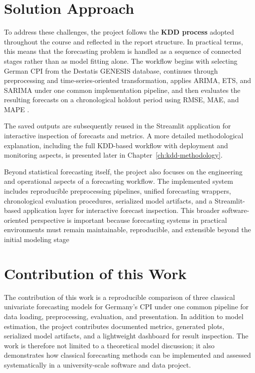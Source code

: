 \section{Solution Approach}
To address these challenges, the project follows the \textbf{KDD process} adopted throughout the course and reflected in the report structure. In practical terms, this means that the forecasting problem is handled as a sequence of connected stages rather than as model fitting alone. The workflow begins with selecting German CPI from the Destatis GENESIS database, continues through preprocessing and time-series-oriented transformation, applies ARIMA, ETS, and SARIMA under one common implementation pipeline, and then evaluates the resulting forecasts on a chronological holdout period using RMSE, MAE, and MAPE \cite{Fayyad:1996,Hyndman2021}.

The saved outputs are subsequently reused in the Streamlit application for interactive inspection of forecasts and metrics. A more detailed methodological explanation, including the full KDD-based workflow with deployment and monitoring aspects, is presented later in Chapter~\ref{ch:kdd-methodology}.

Beyond statistical forecasting itself, the project also focuses on the engineering and operational aspects of a forecasting workflow. The implemented system includes reproducible preprocessing pipelines, unified forecasting wrappers, chronological evaluation procedures, serialized model artifacts, and a Streamlit-based application layer for interactive forecast inspection. This broader software-oriented perspective is important because forecasting systems in practical environments must remain maintainable, reproducible, and extensible beyond the initial modeling stage \cite{Brownlee2017} 

\section{Contribution of this Work}
The contribution of this work is a reproducible comparison of three classical univariate forecasting models for Germany's CPI under one common pipeline for data loading, preprocessing, evaluation, and presentation. In addition to model estimation, the project contributes documented metrics, generated plots, serialized model artifacts, and a lightweight dashboard for result inspection. The work is therefore not limited to a theoretical model discussion; it also demonstrates how classical forecasting methods can be implemented and assessed systematically in a university-scale software and data project.


